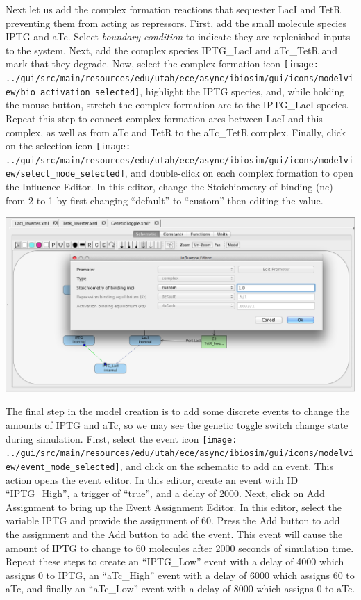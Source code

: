\documentclass[titlepage,11pt]{article}
\begin{document}
Next let us add the complex formation reactions that sequester LacI and TetR preventing them from acting as repressors.  First, add the small molecule species IPTG and aTc.  Select \emph{boundary condition} to indicate they are replenished inputs to the system.  Next, add the complex species IPTG\_LacI and aTc\_TetR and mark that they degrade.  Now, select the complex formation icon \texttt{[image: ../gui/src/main/resources/edu/utah/ece/async/ibiosim/gui/icons/modelview/bio\_activation\_selected]}, highlight the IPTG species, and, while holding the mouse button, stretch the complex formation arc to the IPTG\_LacI species.  Repeat this step to connect complex formation arcs between LacI and this complex, as well as from aTc and TetR to the aTc\_TetR complex.  Finally, click on the selection icon 
\texttt{[image: ../gui/src/main/resources/edu/utah/ece/async/ibiosim/gui/icons/modelview/select\_mode\_selected]}, and
double-click on each complex formation to open the Influence Editor.  In this editor, change the Stoichiometry of binding (nc) from 2 to 1 by first changing ``default'' to ``custom'' then editing the value.

\begin{center}
\includegraphics[width=160mm]{screenshots/complexGT}
\end{center}

The final step in the model creation is to add some discrete events to change the amounts of IPTG and aTc, so we may see the genetic toggle switch change state during simulation.  First, select the event icon \texttt{[image: ../gui/src/main/resources/edu/utah/ece/async/ibiosim/gui/icons/modelview/event\_mode\_selected]}, and click on the schematic to add an event.  This action opens the event editor.  In this editor, create an event with ID ``IPTG\_High'', a trigger of ``true'', and a delay of 2000.  Next, click on Add Assignment to bring up the Event Assignment Editor.  In this editor, select the variable IPTG and provide the assignment of 60.  Press the Add button to add the assignment and the Add button to add the event.  This event will cause the amount of IPTG to change to 60 molecules after 2000 seconds of simulation time.  Repeat these steps to create an ``IPTG\_Low'' event with a delay of 4000 which assigns 0 to IPTG, an ``aTc\_High'' event with a delay of 6000 which assigns 60 to aTc, and finally an ``aTc\_Low'' event with a delay of 8000 which assigns 0 to aTc.
\end{document}
